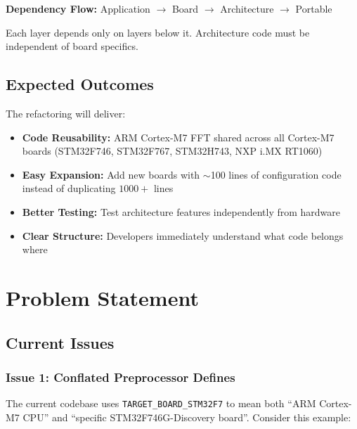 \documentclass[11pt,a4paper]{article}
\begin{document}
\begin{tcolorbox}[colback=blue!5!white,colframe=blue!75!black,title=Key Principle]
\textbf{Dependency Flow:} Application $\rightarrow$ Board $\rightarrow$ Architecture $\rightarrow$ Portable

Each layer depends only on layers below it. Architecture code must be independent of board specifics.
\end{tcolorbox}

\subsection{Expected Outcomes}

The refactoring will deliver:

\begin{itemize}
    \item \textbf{Code Reusability:} ARM Cortex-M7 FFT shared across all Cortex-M7 boards (STM32F746, STM32F767, STM32H743, NXP i.MX RT1060)
    \item \textbf{Easy Expansion:} Add new boards with $\sim$100 lines of configuration code instead of duplicating $1000+$ lines
    \item \textbf{Better Testing:} Test architecture features independently from hardware
    \item \textbf{Clear Structure:} Developers immediately understand what code belongs where
\end{itemize}

\section{Problem Statement}

\subsection{Current Issues}

\subsubsection{Issue 1: Conflated Preprocessor Defines}

The current codebase uses \texttt{TARGET\_BOARD\_STM32F7} to mean both ``ARM Cortex-M7 CPU'' and ``specific STM32F746G-Discovery board''. Consider this example:
\end{document}
